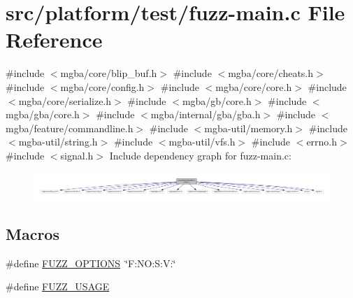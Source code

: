 \hypertarget{fuzz-main_8c}{}\section{src/platform/test/fuzz-\/main.c File Reference}
\label{fuzz-main_8c}
{\ttfamily \#include $<$mgba/core/blip\+\_\+buf.\+h$>$}\newline
{\ttfamily \#include $<$mgba/core/cheats.\+h$>$}\newline
{\ttfamily \#include $<$mgba/core/config.\+h$>$}\newline
{\ttfamily \#include $<$mgba/core/core.\+h$>$}\newline
{\ttfamily \#include $<$mgba/core/serialize.\+h$>$}\newline
{\ttfamily \#include $<$mgba/gb/core.\+h$>$}\newline
{\ttfamily \#include $<$mgba/gba/core.\+h$>$}\newline
{\ttfamily \#include $<$mgba/internal/gba/gba.\+h$>$}\newline
{\ttfamily \#include $<$mgba/feature/commandline.\+h$>$}\newline
{\ttfamily \#include $<$mgba-\/util/memory.\+h$>$}\newline
{\ttfamily \#include $<$mgba-\/util/string.\+h$>$}\newline
{\ttfamily \#include $<$mgba-\/util/vfs.\+h$>$}\newline
{\ttfamily \#include $<$errno.\+h$>$}\newline
{\ttfamily \#include $<$signal.\+h$>$}\newline
Include dependency graph for fuzz-\/main.c\+:
\nopagebreak
\begin{figure}[H]
\begin{center}
\leavevmode
\includegraphics[width=350pt]{fuzz-main_8c__incl}
\end{center}
\end{figure}
\subsection*{Macros}
\begin{DoxyCompactItemize}
\item 
\#define \mbox{\hyperlink{fuzz-main_8c_a1ba1c6c17fafca1710418ac9abfd7994}{F\+U\+Z\+Z\+\_\+\+O\+P\+T\+I\+O\+NS}}~\char`\"{}F\+:\+N\+O\+:\+S\+:\+V\+:\char`\"{}
\item 
\#define \mbox{\hyperlink{fuzz-main_8c_ab48c3f60c1385a1a52801d32023d7584}{F\+U\+Z\+Z\+\_\+\+U\+S\+A\+GE}}
\end{DoxyCompactItemize}
